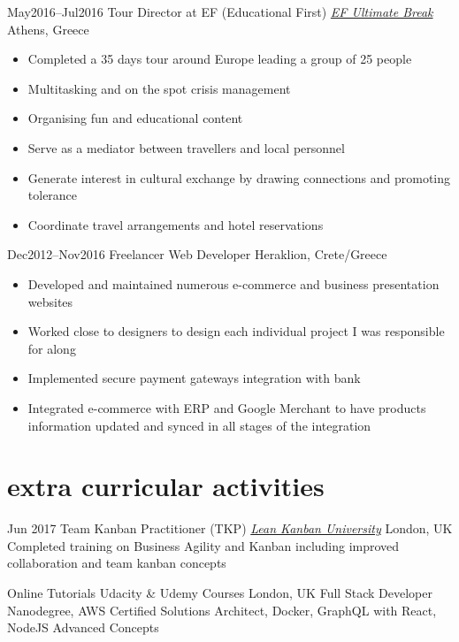 \begin{entrylist}
\entry
{May2016–Jul2016}
{Tour Director at EF (Educational First)  {\normalfont \emph{\href{https://www.efultimatebreak.com/}{EF Ultimate Break}}}}
{Athens, Greece}
\vspace{-0.6cm}
\begin{itemize}[leftmargin=.6cm]	
	\item Completed a 35 days tour around Europe leading a group of 25 people
	\item Multitasking and on the spot crisis management
	\item Organising fun and educational content
	\item Serve as a mediator between travellers and local personnel
	\item Generate interest in cultural exchange by drawing connections and promoting tolerance
	\item Coordinate travel arrangements and hotel reservations
\end{itemize}

\entry
{Dec2012–Nov2016}
{Freelancer Web Developer}
{Heraklion, Crete/Greece}
\vspace{-0.6cm}
\begin{itemize}[leftmargin=.6cm]
	\item Developed and maintained numerous e-commerce and business presentation websites
	\item Worked close to designers to design each individual project I was responsible for along
	\item Implemented secure payment gateways integration with bank
	\item Integrated e-commerce with ERP and Google Merchant to have products information updated and synced in all stages of the integration
\end{itemize}

\end{entrylist}
\vspace{-0.2cm}
\section{\normalfont extra curricular activities}
\begin{entrylist}

\entry
{Jun 2017}
 {Team Kanban Practitioner (TKP) {\normalfont \emph{\href{https://edu.leankanban.com/}{Lean Kanban University}}}} 
{London, UK} 
{Completed training on Business Agility and Kanban including improved collaboration and team kanban concepts}

\entry
{Online Tutorials}
 {Udacity \& Udemy Courses}
{London, UK} 
{Full Stack Developer Nanodegree, AWS Certified Solutions Architect, Docker, GraphQL with React, NodeJS Advanced Concepts}
\end{entrylist}